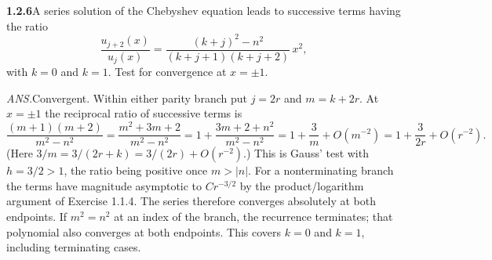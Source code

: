 \par\bigskip
\noindent\textbf{1.2.6}\quad A series solution of the Chebyshev equation leads
to successive terms having the ratio
\[
\frac{u_{j+2}(x)}{u_{j}(x)}=\frac{(k+j)^{2}-n^{2}}{(k+j+1)(k+j+2)}\,x^{2},
\]
with $k=0$ and $k=1$. Test for convergence at $x=\pm1$.
\par\nobreak\hfill\emph{ANS.}\enspace Convergent.
\solution
Within either parity branch put $j=2r$ and $m=k+2r$. At $x=\pm1$ the
reciprocal ratio of successive terms is
\[
 \frac{(m+1)(m+2)}{m^2-n^2}
 =\frac{m^2+3m+2}{m^2-n^2}
 =1+\frac{3m+2+n^2}{m^2-n^2}
 =1+\frac3m+O(m^{-2})
 =1+\frac{3}{2r}+O(r^{-2}).
\]
(Here $3/m=3/(2r+k)=3/(2r)+O(r^{-2})$.) This is Gauss' test with
$h=3/2>1$, the ratio being positive once $m>|n|$. For a nonterminating
branch the terms have magnitude asymptotic to
$Cr^{-3/2}$ by the product/logarithm argument of Exercise 1.1.4.
The series therefore converges absolutely at both endpoints.
If $m^2=n^2$ at an index of the branch, the recurrence terminates;
that polynomial also converges at both endpoints. This covers $k=0$
and $k=1$, including terminating cases.


